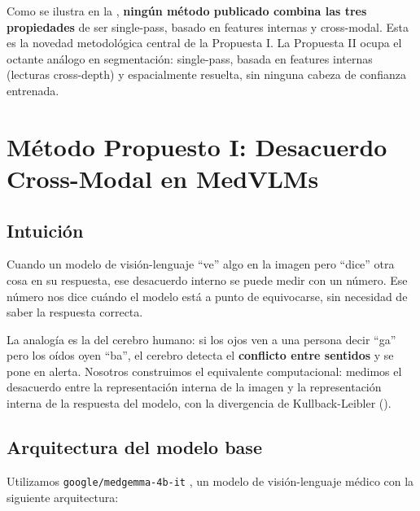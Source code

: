 \documentclass[12pt,a4paper]{article}
\newcommand{\KL}{\mathrm{KL}}
\begin{document}
Como se ilustra en la , \textbf{ningún método publicado combina las tres propiedades} de ser single-pass, basado en features internas y cross-modal.
Esta es la novedad metodológica central de la Propuesta I.
La Propuesta II ocupa el octante análogo en segmentación: single-pass, basada en features internas (lecturas cross-depth) y espacialmente resuelta, sin ninguna cabeza de confianza entrenada.

\section{Método Propuesto I: Desacuerdo Cross-Modal en MedVLMs}
\label{sec:metodo1}

\subsection{Intuición}

Cuando un modelo de visión-lenguaje ``ve'' algo en la imagen pero ``dice'' otra cosa en su respuesta, ese desacuerdo interno se puede medir con un número.
Ese número nos dice cuándo el modelo está a punto de equivocarse, sin necesidad de saber la respuesta correcta.

La analogía es la del cerebro humano: si los ojos ven a una persona decir ``ga'' pero los oídos oyen ``ba'', el cerebro detecta el \textbf{conflicto entre sentidos} y se pone en alerta.
Nosotros construimos el equivalente computacional: medimos el desacuerdo entre la representación interna de la imagen y la representación interna de la respuesta del modelo, con la divergencia de Kullback-Leibler (\KL).

\subsection{Arquitectura del modelo base}

Utilizamos \texttt{google/medgemma-4b-it} \citep{sellergren2025medgemma}, un modelo de visión-lenguaje médico con la siguiente arquitectura:
\end{document}
